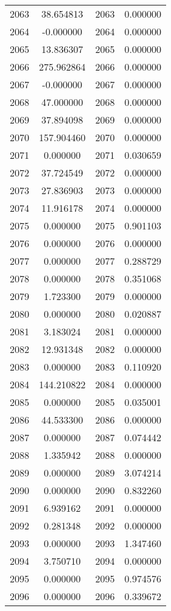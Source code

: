 \documentclass[12pt]{article}
\begin{document}
\begin{longtable}{@{}cccc@{}}
2063 & 38.654813 & 2063 & 0.000000 \\
2064 & -0.000000 & 2064 & 0.000000 \\
2065 & 13.836307 & 2065 & 0.000000 \\
2066 & 275.962864 & 2066 & 0.000000 \\
2067 & -0.000000 & 2067 & 0.000000 \\
2068 & 47.000000 & 2068 & 0.000000 \\
2069 & 37.894098 & 2069 & 0.000000 \\
2070 & 157.904460 & 2070 & 0.000000 \\
2071 & 0.000000 & 2071 & 0.030659 \\
2072 & 37.724549 & 2072 & 0.000000 \\
2073 & 27.836903 & 2073 & 0.000000 \\
2074 & 11.916178 & 2074 & 0.000000 \\
2075 & 0.000000 & 2075 & 0.901103 \\
2076 & 0.000000 & 2076 & 0.000000 \\
2077 & 0.000000 & 2077 & 0.288729 \\
2078 & 0.000000 & 2078 & 0.351068 \\
2079 & 1.723300 & 2079 & 0.000000 \\
2080 & 0.000000 & 2080 & 0.020887 \\
2081 & 3.183024 & 2081 & 0.000000 \\
2082 & 12.931348 & 2082 & 0.000000 \\
2083 & 0.000000 & 2083 & 0.110920 \\
2084 & 144.210822 & 2084 & 0.000000 \\
2085 & 0.000000 & 2085 & 0.035001 \\
2086 & 44.533300 & 2086 & 0.000000 \\
2087 & 0.000000 & 2087 & 0.074442 \\
2088 & 1.335942 & 2088 & 0.000000 \\
2089 & 0.000000 & 2089 & 3.074214 \\
2090 & 0.000000 & 2090 & 0.832260 \\
2091 & 6.939162 & 2091 & 0.000000 \\
2092 & 0.281348 & 2092 & 0.000000 \\
2093 & 0.000000 & 2093 & 1.347460 \\
2094 & 3.750710 & 2094 & 0.000000 \\
2095 & 0.000000 & 2095 & 0.974576 \\
2096 & 0.000000 & 2096 & 0.339672 \\

\end{longtable}
\end{document}
